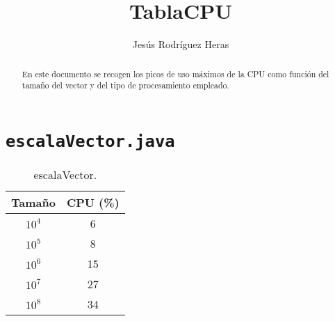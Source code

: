 \documentclass[12pt,letterpaper]{article}
\title{TablaCPU}
\author{Jesús Rodríguez Heras}
\begin{document}
	
	\maketitle
	\begin{abstract} %
		\begin{center}
			En este documento se recogen los picos de uso máximos de la CPU como función del tamaño del vector y del tipo de procesamiento empleado.
		\end{center}
	\end{abstract}
	\thispagestyle{empty}
	\newpage
	
	\tableofcontents
	\newpage
	
	
	
	
	\lstset{language=bash, numbers=left, numberstyle=\tiny, numbersep=10pt, firstnumber=1, stepnumber=1, basicstyle=\small\ttfamily, tabsize=1, extendedchars=true, inputencoding=latin1}


\section{\texttt{escalaVector.java}}

\begin{center}
\begin{table}[htbp]
	\begin{center}
		\begin{tabular}{|c|c|}
			\hline
			\textbf{Tamaño} & \textbf{CPU (\%)}  \\
			\hline 
			$10^4$ & 6 \\ \hline	
			$10^5$ & 8 \\ \hline
			$10^6$ & 15 \\ \hline
			$10^7$ & 27 \\ \hline
			$10^8$ & 34 \\ \hline
		\end{tabular}
		\caption{escalaVector.}
		\label{tabla:escalaVector}
	\end{center}
\end{table}
\end{center}
\end{document}
